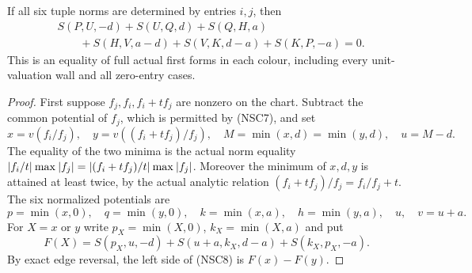 \begin{lemma}
If all six tuple norms are determined by entries $i,j$, then
\[
 \begin{split}
 &S(P,U,-d)+S(U,Q,d)+S(Q,H,a)\\
 &\qquad+S(H,V,a-d)+S(V,K,d-a)+S(K,P,-a)=0 .
 \end{split}
 \tag{NSC8}
\]
This is an equality of full actual first forms in each colour,
including every unit-valuation wall and all zero-entry cases.
\end{lemma}

\begin{proof}
First suppose $f_j,f_i,f_i+t f_j$ are nonzero on the chart.
Subtract the common potential of $f_j$, which is permitted
by (NSC7), and set
\[
 x=v(f_i/f_j),\quad y=v((f_i+t f_j)/f_j),\quad
 M=\min(x,d)=\min(y,d),\quad u=M-d .
 \tag{NSC9}
\]
The equality of the two minima is the actual norm equality
$|f_i/t| \mathbin{\rm max}|f_j|
 =|(f_i+t f_j)/t| \mathbin{\rm max}|f_j|$.
Moreover the minimum of $x,d,y$ is attained at least
twice, by the actual analytic relation
$(f_i+t f_j)/f_j=f_i/f_j+t$.
The six normalized potentials are
\[
 p=\min(x,0),\quad q=\min(y,0),\quad
 k=\min(x,a),\quad h=\min(y,a),\quad u,\quad v=u+a .
 \tag{NSC10}
\]
For $X=x$ or $y$ write $p_X=\min(X,0)$, $k_X=\min(X,a)$
and put
\[
 F(X)=S(p_X,u,-d)+S(u+a,k_X,d-a)+S(k_X,p_X,-a).
 \tag{NSC11}
\]
By exact edge reversal, the left side of (NSC8) is
$F(x)-F(y)$.


\end{proof}
